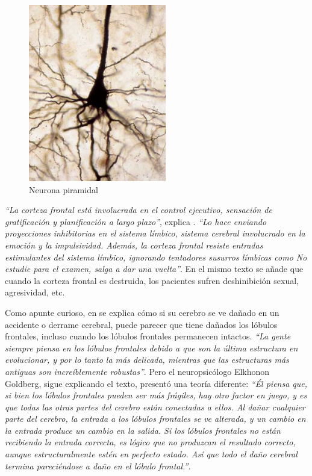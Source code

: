\begin{figure}[h]
  \begin{center}
    \includegraphics[width=6cm]{images/piramidal.jpg}
    \caption{Neurona piramidal}
    \label{piramidal}
  \end{center}
\end{figure}

{\it ``La corteza frontal está involucrada en el control ejecutivo, sensación de gratificación y planificación a largo plazo''}, explica \cite{Sapolsky2004}. {\it ``Lo hace enviando proyecciones inhibitorias en el sistema límbico, sistema cerebral involucrado en la emoción y la impulsividad. Además, la corteza frontal resiste entradas estimulantes del sistema límbico, ignorando tentadores susurros límbicas como \guillemotleft No estudie para el examen, salga a dar una vuelta\guillemotright''}. En el mismo texto se añade que cuando la corteza frontal es destruida, los pacientes sufren deshinibición sexual, agresividad, etc.

Como apunte curioso, en \cite{Johnson2005} se explica cómo si su cerebro se ve dañado en un accidente o derrame cerebral, puede parecer que tiene dañados los lóbulos frontales, incluso cuando los lóbulos frontales permanecen intactos. {\it ``La gente siempre piensa en los lóbulos frontales debido a que son la última estructura en evolucionar, y por lo tanto la más delicada, mientras que las estructuras más antiguas son increíblemente robustas''}. Pero el neuropsicólogo Elkhonon Goldberg, sigue explicando el texto, presentó una teoría diferente: {\it ``Él piensa que, si bien los lóbulos frontales pueden ser más frágiles, hay otro factor en juego, y es que todas las otras partes del cerebro están conectadas a ellos. Al dañar cualquier parte del cerebro, la entrada a los lóbulos frontales se ve alterada, y un cambio en la entrada produce un cambio en la salida. Si los lóbulos frontales no están recibiendo la entrada correcta, es lógico que no produzcan el resultado correcto, aunque estructuralmente estén en perfecto estado. Así que todo el daño cerebral termina pareciéndose a daño en el lóbulo frontal.''}.

